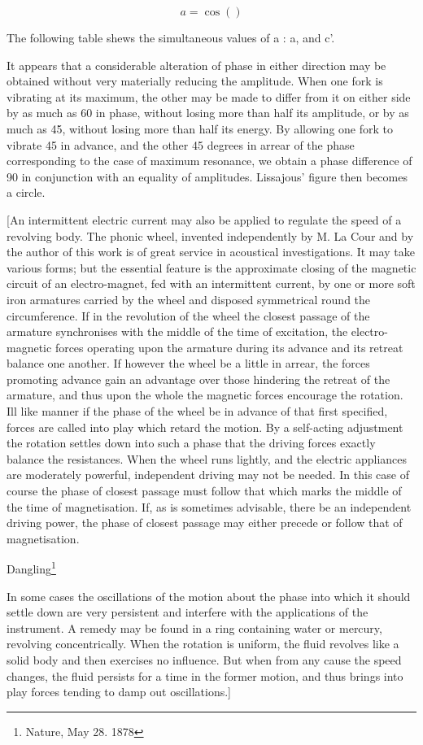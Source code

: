 \[a= \cos()\]

The following table shews the simultaneous values of a : a, and c'.

It appears that a considerable alteration of phase in either direction may be
obtained without very materially reducing the amplitude. When one fork is
vibrating at its maximum, the other may be made to differ from it on either
side by as much as 60 in phase, without losing more than half its amplitude, or
by as much as 45, without losing more than half its energy. By allowing one
fork to vibrate 45 in advance, and the other 45 degrees in arrear of the phase
corresponding to the case of maximum resonance, we obtain a phase difference of
90 in conjunction with an equality of amplitudes. Lissajous' figure then
becomes a circle.

[An intermittent electric current may also be applied to regulate the speed of
a revolving body. The phonic wheel, invented independently by M. La Cour and by
the author of this work is of great service in acoustical investigations. It
may take various forms; but the essential feature is the approximate closing of
the magnetic circuit of an electro-magnet, fed with an intermittent current, by
one or more soft iron armatures carried by the wheel and disposed symmetrical
round the circumference.  If in the revolution of the wheel the closest passage
of the armature synchronises with the middle of the time of excitation, the
electro-magnetic forces operating upon the armature during its advance and its
retreat balance one another. If however the wheel be a little in arrear, the
forces promoting advance gain an advantage over those hindering the retreat of
the armature, and thus upon the whole the magnetic forces encourage the
rotation.  Ill like manner if the phase of the wheel be in advance of that
first specified, forces are called into play which retard the motion.  By a
self-acting adjustment the rotation settles down into such a phase that the
driving forces exactly balance the resistances.  When the wheel runs lightly,
and the electric appliances are moderately powerful, independent driving may
not be needed. In this case of course the phase of closest passage must follow
that which marks the middle of the time of magnetisation. If, as is sometimes
advisable, there be an independent driving power, the phase of closest passage
may either precede or follow that of magnetisation.

Dangling\footnote{ Nature, May 28. 1878}

In some cases the oscillations of the motion about the phase into which it
should settle down are very persistent and interfere with the applications of
the instrument. A remedy may be found in a ring containing water or mercury,
revolving concentrically.  When the rotation is uniform, the fluid revolves
like a solid body and then exercises no influence. But when from any cause the
speed changes, the fluid persists for a time in the former motion, and thus
brings into play forces tending to damp out oscillations.]

